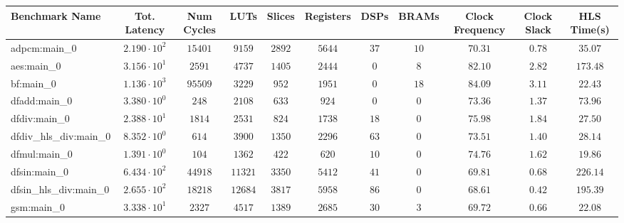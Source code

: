 \begin{tabular}{|l|c|c|c|c|c|c|c|c|c|c|}
\hline
Benchmark Name          & Tot. Latency           & Num Cycles & LUTs      & Slices    & Registers & DSPs    & BRAMs   & Clock Frequency & Clock Slack & HLS Time(s) \\
\hline
adpcm:main\_0           & $ 2.190 \cdot 10^{2} $ & $ 15401  $ & $ 9159  $ & $ 2892  $ & $ 5644  $ & $ 37  $ & $ 10  $ & $ 70.31       $ & $ 0.78    $ & $ 35.07   $ \\
aes:main\_0             & $ 3.156 \cdot 10^{1} $ & $ 2591   $ & $ 4737  $ & $ 1405  $ & $ 2444  $ & $ 0   $ & $ 8   $ & $ 82.10       $ & $ 2.82    $ & $ 173.48  $ \\
bf:main\_0              & $ 1.136 \cdot 10^{3} $ & $ 95509  $ & $ 3229  $ & $ 952   $ & $ 1951  $ & $ 0   $ & $ 18  $ & $ 84.09       $ & $ 3.11    $ & $ 22.43   $ \\
dfadd:main\_0           & $ 3.380 \cdot 10^{0} $ & $ 248    $ & $ 2108  $ & $ 633   $ & $ 924   $ & $ 0   $ & $ 0   $ & $ 73.36       $ & $ 1.37    $ & $ 73.96   $ \\
dfdiv:main\_0           & $ 2.388 \cdot 10^{1} $ & $ 1814   $ & $ 2531  $ & $ 824   $ & $ 1738  $ & $ 18  $ & $ 0   $ & $ 75.98       $ & $ 1.84    $ & $ 27.50   $ \\
dfdiv\_hls\_div:main\_0 & $ 8.352 \cdot 10^{0} $ & $ 614    $ & $ 3900  $ & $ 1350  $ & $ 2296  $ & $ 63  $ & $ 0   $ & $ 73.51       $ & $ 1.40    $ & $ 28.14   $ \\
dfmul:main\_0           & $ 1.391 \cdot 10^{0} $ & $ 104    $ & $ 1362  $ & $ 422   $ & $ 620   $ & $ 10  $ & $ 0   $ & $ 74.76       $ & $ 1.62    $ & $ 19.86   $ \\
dfsin:main\_0           & $ 6.434 \cdot 10^{2} $ & $ 44918  $ & $ 11321 $ & $ 3350  $ & $ 5412  $ & $ 41  $ & $ 0   $ & $ 69.81       $ & $ 0.68    $ & $ 226.14  $ \\
dfsin\_hls\_div:main\_0 & $ 2.655 \cdot 10^{2} $ & $ 18218  $ & $ 12684 $ & $ 3817  $ & $ 5958  $ & $ 86  $ & $ 0   $ & $ 68.61       $ & $ 0.42    $ & $ 195.39  $ \\
gsm:main\_0             & $ 3.338 \cdot 10^{1} $ & $ 2327   $ & $ 4517  $ & $ 1389  $ & $ 2685  $ & $ 30  $ & $ 3   $ & $ 69.72       $ & $ 0.66    $ & $ 22.08   $ \\

\end{tabular}
